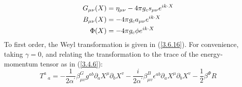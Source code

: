 \begin{subequations}
	\patchcmd{\theparentequation}{0.0}{}{}{}
	\begin{align}
		G_{\mu \nu}(X) &= \eta_{\mu \nu} - 4 \pi g_c s_{\mu \nu} e^{i k \cdot X} \\
		B_{\mu \nu}(X) &= -4 \pi g_c a_{\mu \nu} e^{i k \cdot X} \\
		\Phi(X) &= -4 \pi g_c \phi e^{i k \cdot X}
	\end{align}\label{3.7.11}
\end{subequations}
To first order, the Weyl transformation is given in (\ref{3.6.16}). For convenience, taking $\gamma=0$, and relating the transformation to the trace of the energy-momentum tensor as in (\ref{3.4.6}):
\begin{equation}
	T^{a}\,_{a}=-\frac{1}{2 \alpha^{\prime}} \beta_{\mu v}^{G} g^{a b} \partial_{a} X^{\mu} \partial_{b} X^{v}-\frac{i}{2 \alpha^{\prime}} \beta_{\mu v}^{B} \epsilon^{a b} \partial_{a} X^{\mu} \partial_{b} X^{v}-\frac{1}{2} \beta^{\Phi} R\label{3.7.12}
\end{equation}
